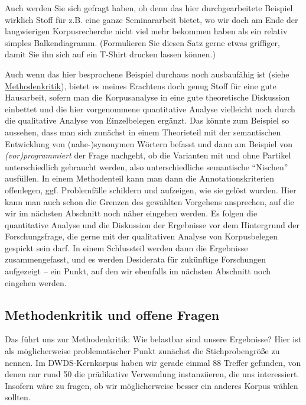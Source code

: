 \documentclass[]{article}
\begin{document}
Auch werden Sie sich gefragt haben, ob denn das hier durchgearbeitete
Beispiel wirklich Stoff für z.B. eine ganze Seminararbeit bietet, wo wir
doch am Ende der langwierigen Korpusrecherche nicht viel mehr bekommen
haben als ein relativ simples Balkendiagramm. (Formulieren Sie diesen
Satz gerne etwas griffiger, damit Sie ihn sich auf ein T-Shirt drucken
lassen können.)

Auch wenn das hier besprochene Beispiel durchaus noch ausbaufähig ist
(siehe
\protect\hyperlink{methodenkritik-und-offene-fragen}{Methodenkritik}),
bietet es meines Erachtens doch genug Stoff für eine gute Hausarbeit,
sofern man die Korpusanalyse in eine gute theoretische Diskussion
einbettet und die hier vorgenommene quantitative Analyse vielleicht noch
durch die qualitative Analyse von Einzelbelegen ergänzt. Das könnte zum
Beispiel so aussehen, dass man sich zunächst in einem Theorieteil mit
der semantischen Entwicklung von (nahe-)synonymen Wörtern befasst und
dann am Beispiel von \emph{(vor)programmiert} der Frage nachgeht, ob die
Varianten mit und ohne Partikel unterschiedlich gebraucht werden, also
unterschiedliche semantische \enquote{Nischen} ausfüllen. In einem
Methodenteil kann man dann die Annotationskriterien offenlegen, ggf.
Problemfälle schildern und aufzeigen, wie sie gelöst wurden. Hier kann
man auch schon die Grenzen des gewählten Vorgehens ansprechen, auf die
wir im nächsten Abschnitt noch näher eingehen werden. Es folgen die
quantitative Analyse und die Diskussion der Ergebnisse vor dem
Hintergrund der Forschungsfrage, die gerne mit der qualitativen Analyse
von Korpusbelegen gespickt sein darf. In einem Schlussteil werden dann
die Ergebnisse zusammengefasst, und es werden Desiderata für zukünftige
Forschungen aufgezeigt -- ein Punkt, auf den wir ebenfalls im nächsten
Abschnitt noch eingehen werden.

\hypertarget{methodenkritik-und-offene-fragen}{\subsection{Methodenkritik
und offene Fragen}\label{methodenkritik-und-offene-fragen}}

Das führt uns zur Methodenkritik: Wie belastbar sind unsere Ergebnisse?
Hier ist als möglicherweise problematischer Punkt zunächst die
Stichprobengröße zu nennen. Im DWDS-Kernkorpus haben wir gerade einmal
88 Treffer gefunden, von denen nur rund 50 die prädikative Verwendung
instanziieren, die uns interessiert. Insofern wäre zu fragen, ob wir
möglicherweise besser ein anderes Korpus wählen sollten.
\end{document}
